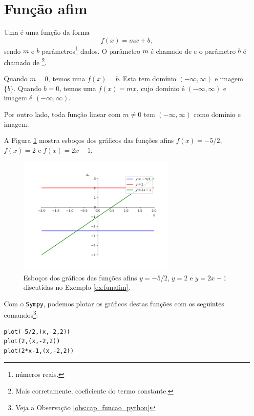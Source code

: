 \section{Função afim}\label{cap_funcao_sec_funafim}

Uma  é uma função da forma
\begin{equation}
f(x) = mx + b,
\end{equation}
sendo $m$ e $b$ parâmetros\footnote{números reais.} dados. O parâmetro $m$ é chamado de  e o parâmetro $b$ é chamado de \footnote{Mais corretamente, coeficiente do termo constante.}.

Quando $m=0$, temos uma  $f(x) = b$. Esta tem domínio $(-\infty, \infty)$ e imagem $\{b\}$. Quando $b=0$, temos uma  $f(x)=mx$, cujo domínio é $(-\infty, \infty)$ e imagem é $(-\infty, \infty)$.

Por outro lado, toda função linear com $m\neq 0$ tem $(-\infty, \infty)$ como domínio e imagem.

\begin{ex}\label{ex:funafim}
  A Figura \ref{fig:ex_funafim} mostra esboços dos gráficos das funções afins $f(x)=-5/2$, $f(x)=2$ e $f(x)=2x-1$.
  
  \begin{figure}[H]
    \centering
    \includegraphics[width=0.7\textwidth]{./cap_funcao/dados/fig_ex_funafim/fig_ex_funafim}
    \caption{Esboços dos gráficos das funções afins $y=-5/2$, $y=2$ e $y=2x-1$ discutidas no Exemplo \ref{ex:funafim}.}
    \label{fig:ex_funafim}
  \end{figure}

  \ifispython
  Com o \verb+Sympy+, podemos plotar os gráficos destas funções com os seguintes comandos\footnote{Veja a Observação \ref{obs:cap_funcao_python}}:
\begin{verbatim}
plot(-5/2,(x,-2,2))
plot(2,(x,-2,2))
plot(2*x-1,(x,-2,2))
\end{verbatim}
  \fi
\end{ex}

